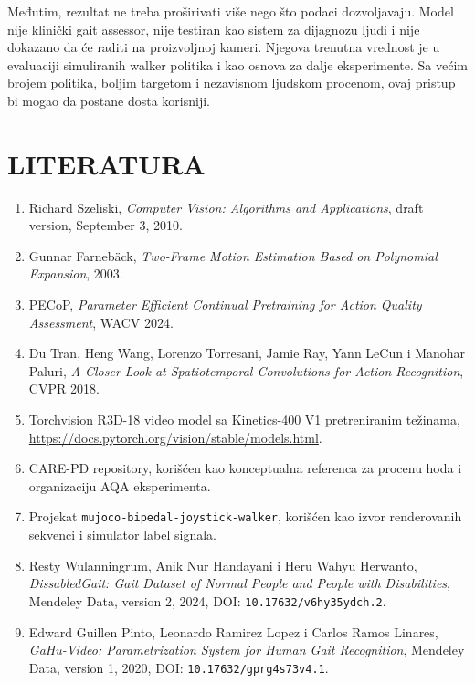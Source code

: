 \documentclass[12pt,a4paper]{report}
\begin{document}
Međutim, rezultat ne treba proširivati više nego što podaci dozvoljavaju.
Model nije klinički gait assessor, nije testiran kao sistem za dijagnozu ljudi
i nije dokazano da će raditi na proizvoljnoj kameri. Njegova trenutna vrednost
je u evaluaciji simuliranih walker politika i kao osnova za dalje eksperimente.
Sa većim brojem politika, boljim targetom i nezavisnom ljudskom procenom, ovaj
pristup bi mogao da postane dosta korisniji.

\chapter*{LITERATURA}

\begin{enumerate}
  \item Richard Szeliski, \textit{Computer Vision: Algorithms and Applications},
  draft version, September 3, 2010.

  \item Gunnar Farnebäck, \textit{Two-Frame Motion Estimation Based on Polynomial
  Expansion}, 2003.

  \item PECoP, \textit{Parameter Efficient Continual Pretraining for Action
  Quality Assessment}, WACV 2024.

  \item Du Tran, Heng Wang, Lorenzo Torresani, Jamie Ray, Yann LeCun i Manohar
  Paluri, \textit{A Closer Look at Spatiotemporal Convolutions for Action
  Recognition}, CVPR 2018.

  \item Torchvision R3D-18 video model sa Kinetics-400 V1 pretreniranim težinama,
  \url{https://docs.pytorch.org/vision/stable/models.html}.

  \item CARE-PD repository, korišćen kao konceptualna referenca za procenu hoda i
  organizaciju AQA eksperimenta.

  \item Projekat \texttt{mujoco-bipedal-joystick-walker}, korišćen kao izvor
  renderovanih sekvenci i simulator label signala.

  \item Resty Wulanningrum, Anik Nur Handayani i Heru Wahyu Herwanto,
  \textit{DissabledGait: Gait Dataset of Normal People and People with
  Disabilities}, Mendeley Data, version 2, 2024,
  DOI: \texttt{10.17632/v6hy35ydch.2}.

  \item Edward Guillen Pinto, Leonardo Ramirez Lopez i Carlos Ramos Linares,
  \textit{GaHu-Video: Parametrization System for Human Gait Recognition},
  Mendeley Data, version 1, 2020, DOI: \texttt{10.17632/gprg4s73v4.1}.


\end{enumerate}
\end{document}
